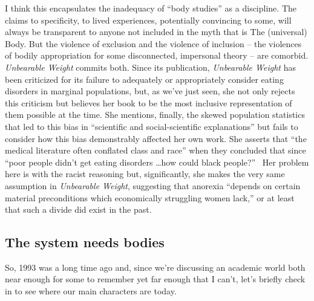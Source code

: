 \documentclass[11pt]{article}
\begin{document}
    I think this encapsulates the inadequacy of ``body studies'' as a discipline. The claims to specificity, to lived experiences, potentially convincing to some, will always be transparent to anyone not included in the myth that is The (universal) Body. But the violence of exclusion and the violence of inclusion -- the violences of bodily appropriation for some disconnected, impersonal theory -- are comorbid. \textit{Unbearable Weight} commits both. Since its publication, \textit{Unbearable Weight} has been criticized for its failure to adequately or appropriately consider eating disorders in marginal populations, but, as we've just seen, she not only rejects this criticism but believes her book to be the most inclusive representation of them possible at the time. She mentions, finally, the skewed population statistics that led to this bias in ``scientific and social-scientific explanations'' but fails to consider how this bias demonstrably affected her own work. She asserts that ``the medical literature often conflated class and race'' when they concluded that since ``poor people didn't get eating disorders \dots how could black people?''~\autocite[266-267]{Bordo09} Her problem here is with the racist reasoning but, significantly, she makes the very same assumption in \textit{Unbearable Weight}, suggesting that anorexia ``depends on certain material preconditions which economically struggling women lack,'' or at least that such a divide did exist in the past.~\autocite[62]{Bordo03} 

    \subsection*{The system needs bodies}

    So, 1993 was a long time ago and, since we're discussing an academic world both near enough for some to remember yet far enough that I can't, let's briefly check in to see where our main characters are today. 
\end{document}
